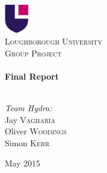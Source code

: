 \begin{titlepage}
\begin{center}

\includegraphics[width=0.08\textwidth]{./img/lu-logo.png}~\\[3cm]

\textsc{\LARGE Loughborough University}\\[2.5cm]

\textsc{\Large Group Project}\\[0.5cm]

\HRule \\[0.4cm]
{ \huge \bfseries Final Report \\[0.4cm] }

\HRule \\[1.5cm]

\noindent
\large
\emph{Team Hydra:}\\
Jay \textsc{Vagharia}\\
Oliver \textsc{Woodings}\\
Simon \textsc{Kerr}
\vfill

{\large May 2015}

\end{center}
\end{titlepage}